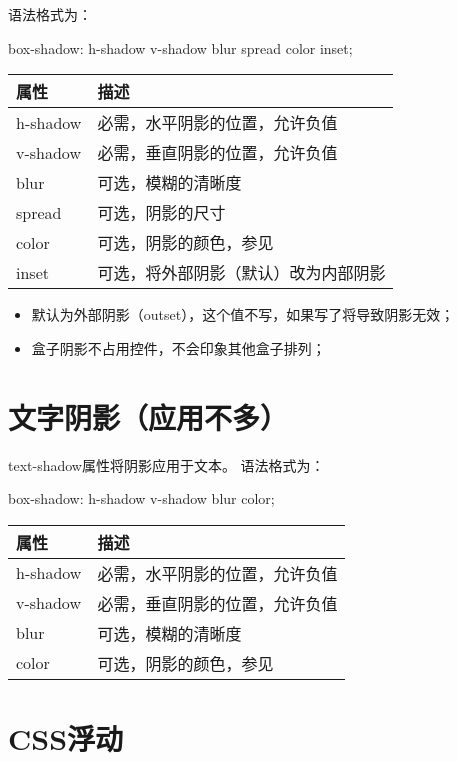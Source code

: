 语法格式为：
\begin{css}
	box-shadow: h-shadow v-shadow blur spread color inset;
\end{css}
\begin{table}[H]
	\centering
	\begin{tabular}{ll}
		\hline
		属性       & 描述                             \\
		\hline
		h-shadow & 必需，水平阴影的位置，允许负值                \\
		v-shadow & 必需，垂直阴影的位置，允许负值                \\
		blur     & 可选，模糊的清晰度                      \\
		spread   & 可选，阴影的尺寸                       \\
		color    & 可选，阴影的颜色，参见\nameref{CCS color} \\
		inset    & 可选，将外部阴影（默认）改为内部阴影             \\
		\hline
	\end{tabular}
\end{table}
\begin{itemize}
	\item 默认为外部阴影（outset），这个值不写，如果写了将导致阴影无效；
	\item 盒子阴影不占用控件，不会印象其他盒子排列；
\end{itemize}
\section{文字阴影（应用不多）}
text-shadow属性将阴影应用于文本。
语法格式为：
\begin{css}
	box-shadow: h-shadow v-shadow blur color;
\end{css}
\begin{table}[H]
	\centering
	\begin{tabular}{ll}
		\hline
		属性       & 描述                             \\
		\hline
		h-shadow & 必需，水平阴影的位置，允许负值                \\
		v-shadow & 必需，垂直阴影的位置，允许负值                \\
		blur     & 可选，模糊的清晰度                      \\
		color    & 可选，阴影的颜色，参见\nameref{CCS color} \\
		\hline
	\end{tabular}
\end{table}
\section{CSS浮动}
